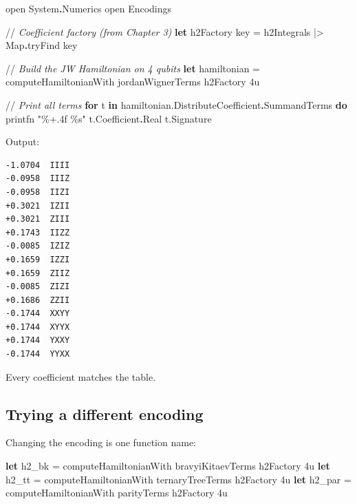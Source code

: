 \documentclass[
  11pt,
  oneside]{book}
\newenvironment{Shaded}{\begin{snugshade}}{\end{snugshade}}
\newcommand{\CommentTok}[1]{\textcolor[rgb]{0.56,0.35,0.01}{\textit{#1}}}
\newcommand{\DecValTok}[1]{\textcolor[rgb]{0.00,0.00,0.81}{#1}}
\newcommand{\KeywordTok}[1]{\textcolor[rgb]{0.13,0.29,0.53}{\textbf{#1}}}
\newcommand{\NormalTok}[1]{#1}
\newcommand{\OtherTok}[1]{\textcolor[rgb]{0.56,0.35,0.01}{#1}}
\newcommand{\StringTok}[1]{\textcolor[rgb]{0.31,0.60,0.02}{#1}}
\begin{document}
\begin{Shaded}
\begin{Highlighting}[]
\OtherTok{open}\NormalTok{ System}\KeywordTok{.}\NormalTok{Numerics}
\OtherTok{open}\NormalTok{ Encodings}

\NormalTok{//}\CommentTok{ Coefficient factory (from Chapter 3)}
\KeywordTok{let}\NormalTok{ h2Factory key = h2Integrals |\textgreater{} Map}\KeywordTok{.}\NormalTok{tryFind key}

\NormalTok{//}\CommentTok{ Build the JW Hamiltonian on 4 qubits}
\KeywordTok{let}\NormalTok{ hamiltonian = computeHamiltonianWith jordanWignerTerms h2Factory }\DecValTok{4}\NormalTok{u}

\NormalTok{//}\CommentTok{ Print all terms}
\KeywordTok{for}\NormalTok{ t }\KeywordTok{in}\NormalTok{ hamiltonian.DistributeCoefficient}\KeywordTok{.}\NormalTok{SummandTerms }\KeywordTok{do}
\NormalTok{    printfn }\StringTok{"\%+.4f  \%s"}\NormalTok{ t.Coefficient}\KeywordTok{.}\NormalTok{Real t.Signature}
\end{Highlighting}
\end{Shaded}

Output:

\begin{verbatim}
-1.0704  IIII
-0.0958  IIIZ
-0.0958  IIZI
+0.3021  IZII
+0.3021  ZIII
+0.1743  IIZZ
-0.0085  IZIZ
+0.1659  IZZI
+0.1659  ZIIZ
-0.0085  ZIZI
+0.1686  ZZII
-0.1744  XXYY
+0.1744  XYYX
+0.1744  YXXY
-0.1744  YYXX
\end{verbatim}

Every coefficient matches the table.

\subsection{Trying a different
encoding}\label{trying-a-different-encoding}

Changing the encoding is one function name:

\begin{Shaded}
\begin{Highlighting}[]
\KeywordTok{let}\NormalTok{ h2\_bk  = computeHamiltonianWith bravyiKitaevTerms  h2Factory }\DecValTok{4}\NormalTok{u}
\KeywordTok{let}\NormalTok{ h2\_tt  = computeHamiltonianWith ternaryTreeTerms    h2Factory }\DecValTok{4}\NormalTok{u}
\KeywordTok{let}\NormalTok{ h2\_par = computeHamiltonianWith parityTerms         h2Factory }\DecValTok{4}\NormalTok{u}
\end{Highlighting}
\end{Shaded}
\end{document}
